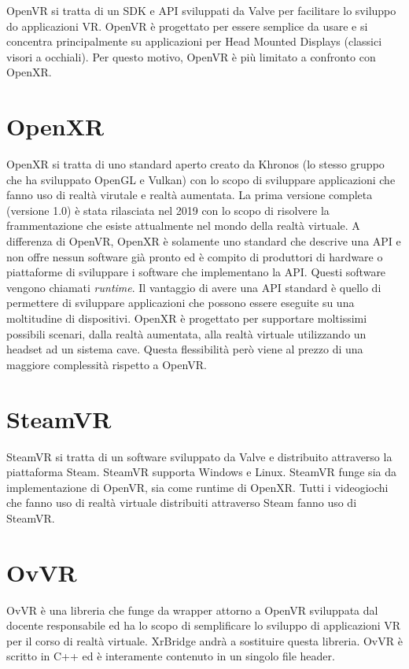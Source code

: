 \documentclass[twoside]{supsistudent}
\begin{document}
OpenVR si tratta di un SDK e API sviluppati da Valve per facilitare lo sviluppo do applicazioni VR. OpenVR è progettato per essere semplice da usare e si concentra principalmente su applicazioni per Head Mounted Displays (classici visori a occhiali). Per questo motivo, OpenVR è più limitato a confronto con OpenXR.

\section{OpenXR}

OpenXR si tratta di uno standard aperto creato da Khronos (lo stesso gruppo che ha sviluppato OpenGL e Vulkan) con lo scopo di sviluppare applicazioni che fanno uso di realtà virutale e realtà aumentata. La prima versione completa (versione 1.0) è stata rilasciata nel 2019 con lo scopo di risolvere la frammentazione che esiste attualmente nel mondo della realtà virtuale. A differenza di OpenVR, OpenXR è solamente uno standard che descrive una API e non offre nessun software già pronto ed è compito di produttori di hardware o piattaforme di sviluppare i software che implementano la API. Questi software vengono chiamati \textit{runtime}. Il vantaggio di avere una API standard è quello di permettere di sviluppare applicazioni che possono essere eseguite su una moltitudine di dispositivi. OpenXR è progettato per supportare moltissimi possibili scenari, dalla realtà aumentata, alla realtà virtuale utilizzando un headset ad un sistema cave. Questa flessibilità però viene al prezzo di una maggiore complessità rispetto a OpenVR.

\section{SteamVR}

SteamVR si tratta di un software sviluppato da Valve e distribuito attraverso la piattaforma Steam. SteamVR supporta Windows e Linux. SteamVR funge sia da implementazione di OpenVR, sia come runtime di OpenXR. Tutti i videogiochi che fanno uso di realtà virtuale distribuiti attraverso Steam fanno uso di SteamVR.

\section{OvVR}

OvVR è una libreria che funge da wrapper attorno a OpenVR sviluppata dal docente responsabile ed ha lo scopo di semplificare lo sviluppo di applicazioni VR per il corso di realtà virtuale. XrBridge andrà a sostituire questa libreria. OvVR è scritto in C++ ed è interamente contenuto in un singolo file header.
\end{document}
